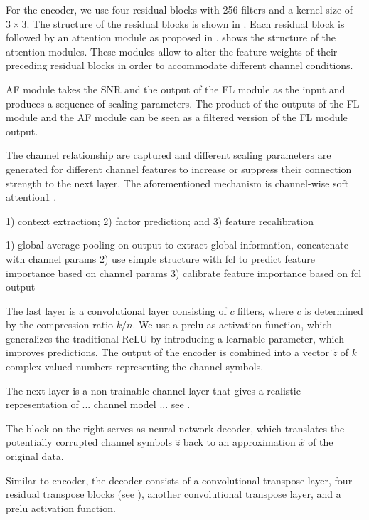 \documentclass[conference]{IEEEtran}
\begin{document}
For the encoder, we use four residual blocks with 256 filters and a kernel size of $3 \times 3$.
The structure of the residual blocks is shown in .
Each residual block is followed by an attention module as proposed in \cite{wireless-attention-modules}.
 shows the structure of the attention modules.
These modules allow to alter the feature weights of their preceding residual blocks in order to accommodate different channel conditions.




AF module takes the SNR and the output of the FL module as the input and produces a sequence of scaling parameters. The product of the outputs of the FL module and the AF module can be seen as a filtered version of the FL module output.

The channel relationship are captured and different scaling parameters are generated for different channel features to increase or suppress their connection strength to the next layer. The aforementioned mechanism is channel-wise soft attention1 .

1) context extraction; 2) factor prediction; and 3) feature recalibration

1) global average pooling on output to extract global information, concatenate with channel params
2) use simple structure with fcl to predict feature importance based on channel params
3) calibrate feature importance based on fcl output

The last layer is a convolutional layer consisting of $c$ filters, where $c$ is determined by the compression ratio $k/n$.
We use a \ac{prelu} as activation function, which generalizes the traditional ReLU by introducing a learnable parameter, which improves predictions.
The output of the encoder is combined into a vector $\tilde{z}$ of $k$ complex-valued numbers representing the channel symbols.

The next layer is a non-trainable channel layer that gives a realistic representation of ... channel model ... see .

The block on the right serves as neural network decoder, which translates the -- potentially corrupted channel symbols $\hat{z}$ back to an approximation $\hat{x}$ of the original data.

Similar to encoder, the decoder consists of a convolutional transpose layer, four residual transpose blocks (see ), another convolutional transpose layer, and a \ac{prelu} activation function.
\end{document}
